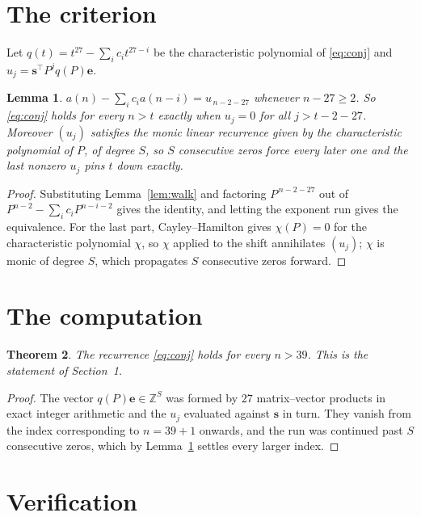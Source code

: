 \documentclass[11pt,a4paper]{article}
\theoremstyle{plain}
\newtheorem{theorem}{Theorem}
\newtheorem{lemma}[theorem]{Lemma}
\theoremstyle{definition}
\begin{document}
\section{The criterion}

Let $q(t)=t^{27}-\sum_i c_i t^{27-i}$ be the characteristic polynomial of
\eqref{eq:conj} and $u_j=\mathbf{s}^{\!\top}P^{j}q(P)\mathbf{e}$.

\begin{lemma}\label{lem:crit}
$a(n)-\sum_i c_i a(n-i)=u_{\,n-2-27}$ whenever $n-27\ge2$. So \eqref{eq:conj}
holds for every $n>t$ exactly when $u_j=0$ for all $j>t-2-27$. Moreover $(u_j)$
satisfies the monic linear recurrence given by the characteristic polynomial of $P$, of
degree $S$, so $S$ consecutive zeros force every later one and the last nonzero $u_j$ pins
$t$ down exactly.
\end{lemma}

\begin{proof}
Substituting Lemma~\ref{lem:walk} and factoring $P^{\,n-2-27}$ out of
$P^{n-2}-\sum_i c_i P^{n-i-2}$ gives the identity, and letting the exponent run gives the
equivalence. For the last part, Cayley--Hamilton gives $\chi(P)=0$ for the characteristic
polynomial $\chi$, so $\chi$ applied to the shift annihilates $(u_j)$; $\chi$ is monic of
degree $S$, which propagates $S$ consecutive zeros forward.
\end{proof}

\section{The computation}

\begin{theorem}
The recurrence \eqref{eq:conj} holds for every $n>39$. This is the statement of
Section~1.
\end{theorem}

\begin{proof}
The vector $q(P)\mathbf{e}\in\mathbb{Z}^{S}$ was formed by $27$ matrix--vector
products in exact integer arithmetic and the $u_j$ evaluated against $\mathbf{s}$ in turn.
They vanish from the index corresponding to $n=39+1$ onwards, and the run was continued
past $S$ consecutive zeros, which by Lemma~\ref{lem:crit} settles every larger index.
\end{proof}

\section{Verification}
\end{document}
